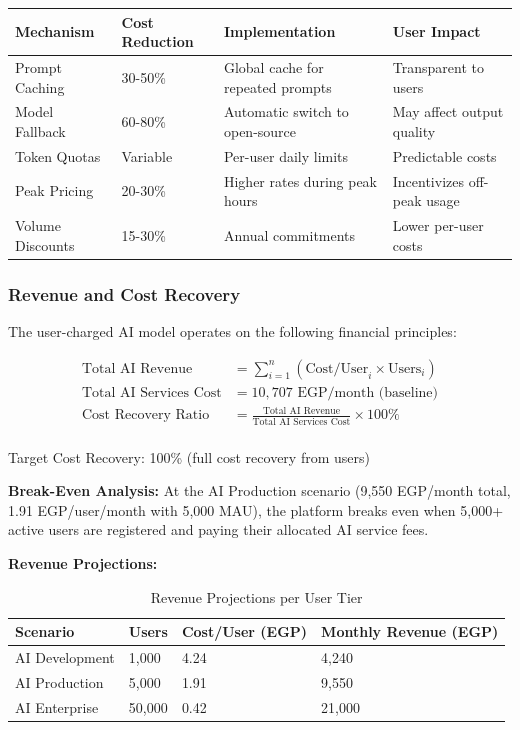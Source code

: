 \documentclass[11pt,a4paper]{article}
\begin{document}
\begin{enumerate}
\begin{table}[H]
\centering
\footnotesize
\begin{tabular}{|l|l|l|l|}
\hline
\textbf{Mechanism} & \textbf{Cost Reduction} & \textbf{Implementation} & \textbf{User Impact} \\
\hline
Prompt Caching & 30-50\% & Global cache for repeated prompts & Transparent to users \\
\hline
Model Fallback & 60-80\% & Automatic switch to open-source & May affect output quality \\
\hline
Token Quotas & Variable & Per-user daily limits & Predictable costs \\
\hline
Peak Pricing & 20-30\% & Higher rates during peak hours & Incentivizes off-peak usage \\
\hline
Volume Discounts & 15-30\% & Annual commitments & Lower per-user costs \\
\hline
\end{tabular}
\end{table}

\subsubsection{Revenue and Cost Recovery}

The user-charged AI model operates on the following financial principles:

\begin{align*}
\text{Total AI Revenue} &= \sum_{i=1}^{n} (\text{Cost/User}_i \times \text{Users}_i) \\
\text{Total AI Services Cost} &= 10,707 \text{ EGP/month (baseline)} \\
\text{Cost Recovery Ratio} &= \frac{\text{Total AI Revenue}}{\text{Total AI Services Cost}} \times 100\% \\
\end{align*}

Target Cost Recovery: 100\% (full cost recovery from users)

\textbf{Break-Even Analysis:} At the AI Production scenario (9,550 EGP/month total, 1.91 EGP/user/month with 5,000 MAU), the platform breaks even when 5,000+ active users are registered and paying their allocated AI service fees.

\textbf{Revenue Projections:}

\begin{table}[H]
\centering
\footnotesize
\begin{tabular}{|l|l|l|l|}
\hline
\textbf{Scenario} & \textbf{Users} & \textbf{Cost/User (EGP)} & \textbf{Monthly Revenue (EGP)} \\
\hline
AI Development & 1,000 & 4.24 & 4,240 \\
AI Production & 5,000 & 1.91 & 9,550 \\
AI Enterprise & 50,000 & 0.42 & 21,000 \\
\hline
\end{tabular}
\caption{Revenue Projections per User Tier}
\end{table}


\end{enumerate}
\end{document}
